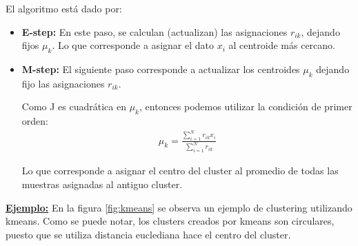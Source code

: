 El algoritmo está dado por:

\begin{itemize}
    \item \textbf{E-step:} En este paso, se calculan (actualizan) las asignaciones $r_{ik}$, dejando fijos $\mu_k$. Lo que corresponde a asignar el dato $x_i$ al centroide más cercano.
    \item \textbf{M-step:} El siguiente paso corresponde a actualizar los centroides $\mu_k$ dejando fijo las asignaciones $r_{ik}$.
    
    Como J es cuadrática en $\mu_k$, entonces podemos utilizar la condición de primer orden:
    \begin{align}
        \mu_k = \frac{\sum_{i=1}^N r_{ik}x_i}{\sum_{i=1}^N r_{ik}}
    \end{align}
    
    Lo que corresponde a asignar el centro del cluster al promedio de todas las muestras asignadas al antiguo cluster.
\end{itemize}

\underline{\textbf{Ejemplo:}} En la figura \ref{fig:kmeans} se observa un ejemplo de clustering utilizando kmeans. Como se puede notar, los clusters creados por kmeans son circulares, puesto que se utiliza distancia euclediana hace el centro del cluster.

